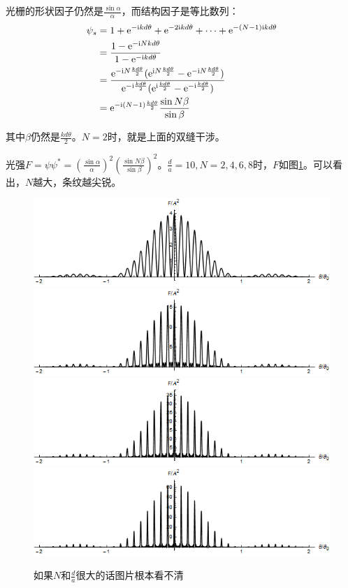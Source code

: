光栅的形状因子仍然是$\frac{\sin \alpha}{\alpha}$，而结构因子是等比数列：
\begin{align*}
\psi_s&=1+\mathrm{e}^{-\mathrm{i} k d \theta}+\mathrm{e}^{-2 \mathrm{i} k d \theta}+\dots+\mathrm{e}^{-(N-1) \mathrm{i} k d \theta} \\
&=\frac{1-\mathrm{e}^{-\mathrm{i} N k d \theta}}{1-\mathrm{e}^{-\mathrm{i} k d \theta}} \\
&=\frac{\mathrm{e}^{-\mathrm{i} N \frac{k d \theta}{2}} (\mathrm{e}^{\mathrm{i} N \frac{k d \theta}{2}}-\mathrm{e}^{-\mathrm{i} N \frac{k d \theta}{2}})}{\mathrm{e}^{-\mathrm{i} \frac{k d \theta}{2}} (\mathrm{e}^{\mathrm{i} \frac{k d \theta}{2}}-\mathrm{e}^{-\mathrm{i} \frac{k d \theta}{2}})} \\
&=\mathrm{e}^{-\mathrm{i} (N-1) \frac{k d \theta}{2}} \frac{\sin N \beta}{\sin \beta}
\end{align*}

其中$\beta$仍然是$\frac{k d \theta}{2}$。$N=2$时，就是上面的双缝干涉。

光强$F=\psi \psi^*=(\frac{\sin \alpha}{\alpha})^2 (\frac{\sin N \beta}{\sin \beta})^2$。$\frac{d}{a}=10,N=2,4,6,8$时，$F$如图\ref{fig-grate}。可以看出，$N$越大，条纹越尖锐。
\begin{figure}[htb]
\centering
\includegraphics[scale=0.3]{fig/grate-2}
\includegraphics[scale=0.3]{fig/grate-4} \\
\includegraphics[scale=0.3]{fig/grate-6}
\includegraphics[scale=0.3]{fig/grate-8}
\caption{如果$N$和$\frac{d}{a}$很大的话图片根本看不清}
\label{fig-grate}
\end{figure}
